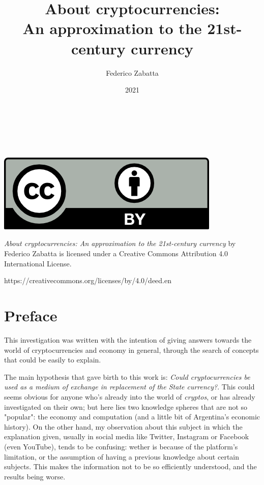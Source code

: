 \documentclass[12pt,a4paper,twoside]{book}
\author{Federico Zabatta}
\date{2021}
\title{\huge About cryptocurrencies: \\
	\large An approximation to the 21st-century currency \\}
\begin{document}
\setcounter{secnumdepth}{-1}

\maketitle
\newpage

\thispagestyle{empty}
\ %
\newpage

\ %

\vspace{12cm}

\includegraphics[scale=1]{img/licencia.png}

\vspace{0.5cm}

\textit{About cryptocurrencies: An approximation to the 21st-century currency} by Federico Zabatta is licensed under a Creative Commons Attribution 4.0 International License.

https://creativecommons.org/licenses/by/4.0/deed.en

\newpage

\tableofcontents

\chapter{Preface}
This investigation was written with the intention of giving answers towards the world of cryptocurrencies and economy in general, through the search of concepts that could be easily to explain.

The main hypothesis that gave birth to this work is: \textit{Could cryptocurrencies be used as a medium of exchange in replacement of the State currency?}. This could seems obvious for anyone who's already into the world of \textit{cryptos}, or has already investigated on their own; but here lies two knowledge spheres that are not so "popular": the economy and computation (and a little bit of Argentina's economic history). On the other hand, my observation about this subject in which the explanation given, usually in social media like Twitter, Instagram or Facebook (even YouTube), tends to be confusing: wether is because of the platform's limitation, or the assumption of having a previous knowledge about certain subjects. This makes the information not to be so efficiently understood, and the results being worse.
\end{document}
